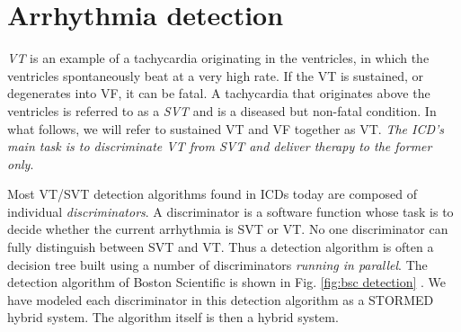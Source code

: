 \section{Arrhythmia detection}
\label{sec:discriminators}
\emph{\ac{VT}} is an example of a tachycardia originating in the ventricles, in which the ventricles spontaneously beat at a very high rate.
If the \ac{VT} is sustained, or degenerates into \ac{VF}, it can be fatal.
A tachycardia that originates above the ventricles is referred to as a \emph{\ac{SVT}} and is a diseased but non-fatal condition.
In what follows, we will refer to sustained \ac{VT} and \ac{VF} together as \ac{VT}.
\emph{The ICD's main task is to discriminate \ac{VT} from \ac{SVT} and deliver therapy to the former only}.

Most \ac{VT}/\ac{SVT} detection algorithms found in ICDs today are composed of individual \emph{discriminators}. 
A discriminator is a software function whose task is to decide whether the current arrhythmia is SVT or VT. 
No one discriminator can fully distinguish between SVT and VT.
Thus a detection algorithm is often a decision tree built using a number of discriminators \emph{running in parallel}.
The detection algorithm of Boston Scientific is shown in Fig. \ref{fig:bsc detection} \cite{compass}.
We have modeled each discriminator in this detection algorithm as a STORMED hybrid system.
The algorithm itself is then a hybrid system.

